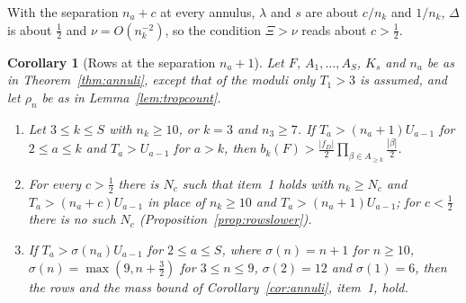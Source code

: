 \documentclass[11pt]{article}
\newtheorem{corollary}[theorem]{Corollary}
\begin{document}
With the separation $n_a+c$ at every annulus, $\lambda$ and $s$ are about
$c/n_k$ and $1/n_k$, $\Delta$ is about $\frac12$ and $\nu=O(n_k^{-2})$, so
the condition $\Xi>\nu$ reads about $c>\frac12$.

\begin{corollary}[Rows at the separation $n_a+1$]\label{cor:rowsplusone}
Let $F$, $A_1,\ldots,A_S$, $K_s$ and $n_a$ be as in
Theorem~\ref{thm:annuli}, except that of the moduli only $T_1>3$ is
assumed, and let $\rho_n$ be as in Lemma~\ref{lem:tropcount}.
\begin{enumerate}
\item Let $3\le k\le S$ with $n_k\ge10$, or $k=3$ and $n_3\ge7$.  If
$T_a>(n_a+1)U_{a-1}$ for $2\le a\le k$ and $T_a>U_{a-1}$ for $a>k$, then
$b_k(F)>\frac{|f_D|}2\prod_{\beta\in A_{\ge k}}\frac{|\beta|}2$.
\item For every $c>\frac12$ there is $N_c$ such that item~1 holds with
$n_k\ge N_c$ and $T_a>(n_a+c)U_{a-1}$ in place of $n_k\ge10$ and
$T_a>(n_a+1)U_{a-1}$; for $c<\frac12$ there is no such $N_c$
(Proposition~\ref{prop:rowslower}).
\item If $T_a>\sigma(n_a)U_{a-1}$ for $2\le a\le S$, where $\sigma(n)=n+1$
for $n\ge10$, $\sigma(n)=\max(9,n+\frac32)$ for $3\le n\le9$, $\sigma(2)=12$
and $\sigma(1)=6$, then the rows and the mass bound of
Corollary~\ref{cor:annuli}, item~1, hold.
\end{enumerate}
\end{corollary}
\end{document}
